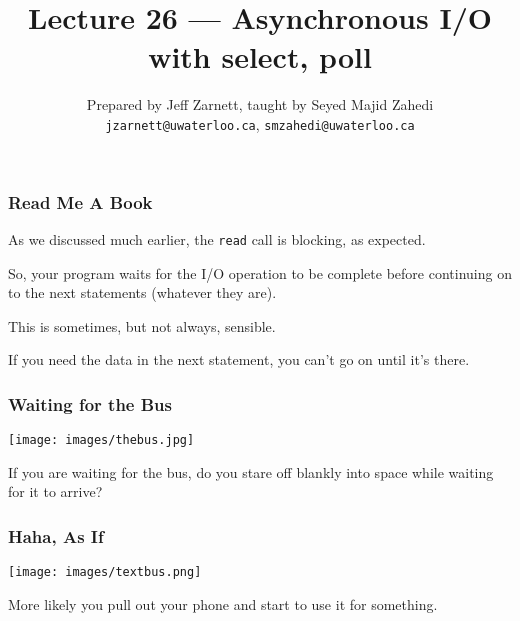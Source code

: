 

\title{Lecture 26 --- Asynchronous I/O with select, poll }

\author{Prepared by Jeff Zarnett, taught by Seyed Majid Zahedi \\ \small \texttt{jzarnett@uwaterloo.ca}, \texttt{smzahedi@uwaterloo.ca}}

\date{}




\begin{frame}
	\titlepage

\end{frame}


\begin{frame}
	\frametitle{Read Me A Book}

	As we discussed much earlier, the \texttt{read} call is blocking, as expected.

	So, your program waits for the I/O operation to be complete before continuing on to the next statements (whatever they are).

	This is sometimes, but not always, sensible.

	If you need the data in the next statement, you can't go on until it's there.

\end{frame}


\begin{frame}
	\frametitle{Waiting for the Bus}

	\begin{center}
		\texttt{[image: images/thebus.jpg]}
	\end{center}

	If you are waiting for the bus, do you stare off blankly into space while waiting for it to arrive?

\end{frame}

\begin{frame}
	\frametitle{Haha, As If}

	\begin{center}
		\texttt{[image: images/textbus.png]}
	\end{center}

	More likely you pull out your phone and start to use it for something.

\end{frame}

